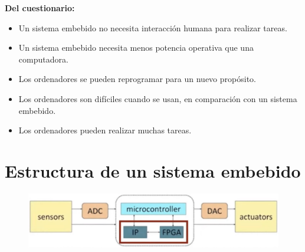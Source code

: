 \documentclass[12pt]{report} %
\begin{document}
\textbf{Del cuestionario:}

\begin{itemize}

\item
  Un sistema embebido no necesita interacción humana para realizar
  tareas.
\item
  Un sistema embebido necesita menos potencia operativa que una
  computadora.
\item
  Los ordenadores se pueden reprogramar para un nuevo propósito.
\item
  Los ordenadores son difíciles cuando se usan, en comparación con un
  sistema embebido.
\item
  Los ordenadores pueden realizar muchas tareas.
\end{itemize}		

\section{Estructura de un sistema embebido}

\begin{figure}[H]
	{\includegraphics[scale=.35]{2021-03-19 16_58_28-DSO Elementos Sistema embebido.mkv.png}}
\end{figure}
\end{document}
